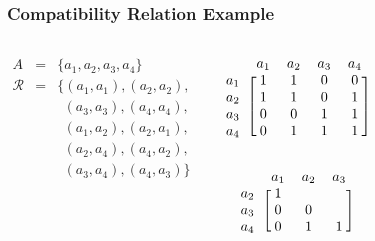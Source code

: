 \documentclass[dvipsnames]{beamer}
\begin{document}
\begin{frame}
  \frametitle{Compatibility Relation Example}

  \begin{columns}
    \begin{eqnarray*}
      A           & = & \{a_1,a_2,a_3,a_4\}\\
      \mathcal{R} & = & \{(a_1,a_1),(a_2,a_2),\\
                  &   & ~~(a_3,a_3),(a_4,a_4),\\
                  &   & ~~(a_1,a_2),(a_2,a_1),\\
                  &   & ~~(a_2,a_4),(a_4,a_2),\\
                  &   & ~~(a_3,a_4),(a_4,a_3)\}\\
    \end{eqnarray*}

    \begin{center}
      \[
        \begin{blockarray}{ccccc}
                & a_1 & a_2 & a_3 & a_4\\
          \begin{block}{c[cccc]}
            a_1 &  1  &  1  &  0  &  0\\
            a_2 &  1  &  1  &  0  &  1\\
            a_3 &  0  &  0  &  1  &  1\\
            a_4 &  0  &  1  &  1  &  1\\
          \end{block}
        \end{blockarray}
      \]

      \[
        \begin{blockarray}{cccc}
                & a_1 & a_2 & a_3\\
          \begin{block}{c[ccc]}
            a_2 &  1  &     & \\
            a_3 &  0  &  0  & \\
            a_4 &  0  &  1  &  1\\
          \end{block}
        \end{blockarray}
      \]
    \end{center}
  \end{columns}
\end{frame}
\end{document}
